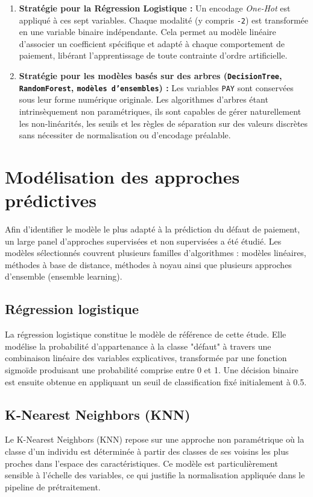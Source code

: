 \documentclass{article}
\begin{document}
\begin{enumerate}
    \item \textbf{Stratégie pour la Régression Logistique :} Un encodage \textit{One-Hot} est appliqué à ces sept variables. Chaque modalité (y compris \texttt{-2}) est transformée en une variable binaire indépendante. Cela permet au modèle linéaire d'associer un coefficient spécifique et adapté à chaque comportement de paiement, libérant l'apprentissage de toute contrainte d'ordre artificielle.
    \item \textbf{Stratégie pour les modèles basés sur des arbres (\texttt{DecisionTree}, \texttt{RandomForest}, \texttt{modèles d'ensembles}) :} Les variables \texttt{PAY} sont conservées sous leur forme numérique originale. Les algorithmes d'arbres étant intrinsèquement non paramétriques, ils sont capables de gérer naturellement les non-linéarités, les seuils et les règles de séparation sur des valeurs discrètes sans nécessiter de normalisation ou d'encodage préalable.
\end{enumerate}

\section{Modélisation des approches prédictives}
Afin d'identifier le modèle le plus adapté à la prédiction du défaut de paiement, un large panel d'approches supervisées et non supervisées a été étudié. Les modèles sélectionnés couvrent plusieurs familles d'algorithmes : modèles linéaires, méthodes à base de distance, méthodes à noyau ainsi que plusieurs approches d'ensemble (ensemble learning).

\subsection{Régression logistique}
La régression logistique constitue le modèle de référence de cette étude. Elle modélise la probabilité d'appartenance à la classe "défaut" à travers une combinaison linéaire des variables explicatives, transformée par une fonction sigmoïde produisant une probabilité comprise entre 0 et 1. Une décision binaire est ensuite obtenue en appliquant un seuil de classification fixé initialement à 0.5.

\subsection{K-Nearest Neighbors (KNN)}
Le K-Nearest Neighbors (KNN) repose sur une approche non paramétrique où la classe d'un individu est déterminée à partir des classes de ses voisins les plus proches dans l'espace des caractéristiques. Ce modèle est particulièrement sensible à l'échelle des variables, ce qui justifie la normalisation appliquée dans le pipeline de prétraitement.
\end{document}
